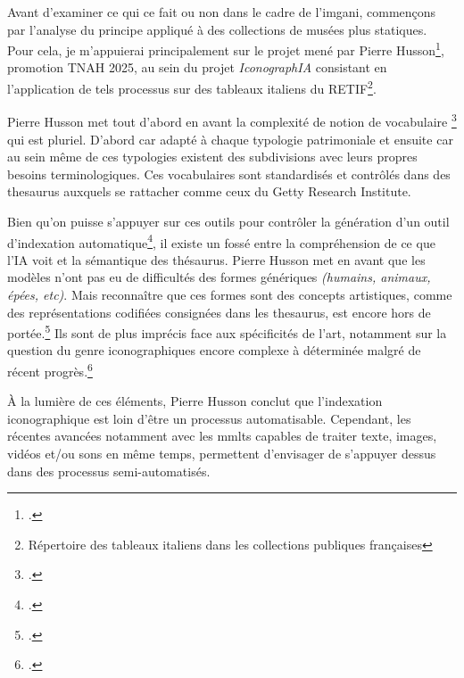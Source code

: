 Avant d'examiner ce qui ce fait ou non dans le cadre de l'\gls{imgani}, commençons par l'analyse du principe appliqué à des collections de musées plus statiques. Pour cela, je m'appuierai principalement sur le projet mené par Pierre Husson\footcite{hussonIndexationIconographiqueIntelligence2025}, promotion TNAH 2025, au sein du projet \textit{IconographIA} consistant en l'application de tels processus sur des tableaux italiens du RETIF\footnote{Répertoire des tableaux italiens dans les collections publiques françaises}. 

Pierre Husson met tout d'abord en avant la complexité de notion de vocabulaire \footcite[p.9 à 17]{hussonIndexationIconographiqueIntelligence2025} qui est pluriel. D'abord car adapté à chaque typologie patrimoniale et ensuite car au sein même de ces typologies existent des subdivisions avec leurs propres besoins terminologiques. Ces vocabulaires sont standardisés et contrôlés dans des \gls{thesaurus} auxquels se rattacher comme ceux du Getty Research Institute. 

Bien qu'on puisse s'appuyer sur ces outils pour contrôler la génération d'un outil d'indexation automatique\footcite[p.38 à 40]{hussonIndexationIconographiqueIntelligence2025}, il existe un fossé entre la compréhension de ce que l'\gls{IA} voit et la sémantique des thésaurus. Pierre Husson met en avant que les modèles n'ont pas eu de difficultés des formes génériques \textit{(humains, animaux, épées, etc)}. Mais reconnaître que ces formes sont des concepts artistiques, comme des représentations codifiées consignées dans les \gls{thesaurus}, est encore hors de portée.\footcite{hussonIndexationIconographiqueIntelligence2025} Ils sont de plus imprécis face aux spécificités de l'art, notamment sur la question du genre iconographiques encore complexe à déterminée malgré de récent progrès.\footcite[p.41 à 43]{hussonIndexationIconographiqueIntelligence2025}

À la lumière de ces éléments, Pierre Husson conclut que l'indexation iconographique est loin d'être un processus automatisable. Cependant, les récentes avancées notamment avec les \gls{mmlts} capables de traiter texte, images, vidéos et/ou sons en même temps, permettent d'envisager de s'appuyer dessus dans des processus semi-automatisés. \newline


